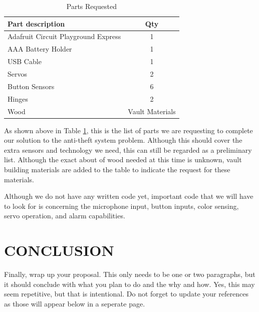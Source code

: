 \documentclass[12pt]{article}
\begin{document}
\begin{table}[ht]
  \caption{Parts Requested}
  \label{table:parts_list}
  \begin{center}
  \begin{tabular}{|p{3in}|c|}
  
  \hline
  Part description & Qty\\
  \hline
  \hline
  Adafruit Circuit Playground Express & 1 \\
  \hline
  AAA Battery Holder & 1 \\
  \hline
  USB Cable & 1 \\
  \hline
  Servos & 2\\
  \hline
  Button Sensors & 6\\
  \hline
  Hinges & 2\\
  \hline
  Wood & Vault Materials\\
  \hline
  \end{tabular}
  \end{center}
  \end{table}
As shown above in Table \ref{table:parts_list}, this is the list of parts we are requesting to complete our solution to the anti-theft system problem. Although this should cover the extra sensors and technology we need, this can still be regarded as a preliminary list. Although the exact about of wood needed at this time is unknown, vault building materials are added to the table to indicate the request for these materials.  

Although we do not have any written code yet, important code that we will have to look for is concerning the microphone input, button inputs, color sensing, servo operation, and alarm capabilities.

\section{CONCLUSION}
Finally, wrap up your proposal. This only needs to be one or two paragraphs, but it should conclude with what you plan to do and the why and how. Yes, this may seem repetitive, but that is intentional. Do not forget to update your references as those will appear below in a seperate page.

\newpage
\printbibliography[heading=subbibintoc]
%
%
\end{document}
